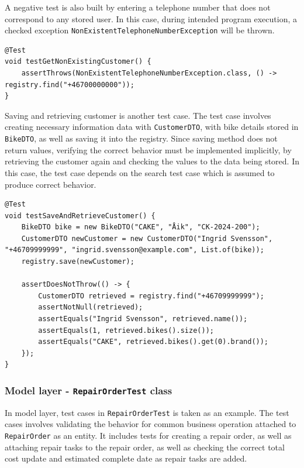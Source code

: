 \documentclass[a4paper]{scrartcl}
\begin{document}
A negative test is also built by entering a telephone number that does not correspond to any stored user. In this case, during intended program execution, a checked exception \texttt{NonExistentTelephoneNumberException} will be thrown. 

\begin{lstlisting}[style=javastyle, caption={Negative test for retrieving a non-existing customer in \texttt{CustomerRegistryTest}}]
@Test
void testGetNonExistingCustomer() {
    assertThrows(NonExistentTelephoneNumberException.class, () -> registry.find("+46700000000"));
}
\end{lstlisting}

Saving and retrieving customer is another test case. The test case involves creating necessary information data with \texttt{CustomerDTO}, with bike details stored in \texttt{BikeDTO}, as well as saving it into the registry. Since saving method does not return values, verifying the correct behavior must be implemented implicitly, by retrieving the customer again and checking the values to the data being stored. In this case, the test case depends on the search test case which is assumed to produce correct behavior.

\begin{lstlisting}[style=javastyle, caption={Test for saving and retrieving a customer in \texttt{CustomerRegistryTest}}]
@Test
void testSaveAndRetrieveCustomer() {
    BikeDTO bike = new BikeDTO("CAKE", "Åik", "CK-2024-200");
    CustomerDTO newCustomer = new CustomerDTO("Ingrid Svensson", "+46709999999", "ingrid.svensson@example.com", List.of(bike));
    registry.save(newCustomer);

    assertDoesNotThrow(() -> {
        CustomerDTO retrieved = registry.find("+46709999999");
        assertNotNull(retrieved);
        assertEquals("Ingrid Svensson", retrieved.name());
        assertEquals(1, retrieved.bikes().size());
        assertEquals("CAKE", retrieved.bikes().get(0).brand());
    });
}
\end{lstlisting}

\subsubsection{Model layer - \texttt{RepairOrderTest} class}

In model layer, test cases in \texttt{RepairOrderTest} is taken as an example. The test cases involves validating the behavior for common business operation attached to \texttt{RepairOrder} as an entity. It includes tests for creating a repair order, as well as attaching repair tasks to the repair order, as well as checking the correct total cost update and estimated complete date as repair tasks are added.
\end{document}
